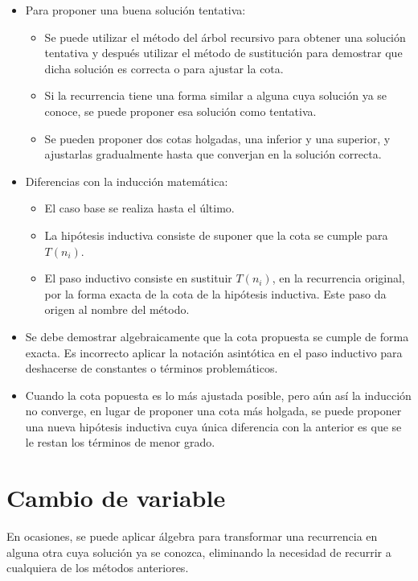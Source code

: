 \begin{itemize}
    \item Para proponer una buena solución tentativa:
    \begin{itemize}
        \item Se puede utilizar el método del árbol recursivo para obtener una solución
        tentativa y después utilizar el método de sustitución para demostrar
        que dicha solución es correcta o para ajustar la cota.
        \item Si la recurrencia tiene una forma similar a alguna cuya solución ya
        se conoce, se puede proponer esa solución como tentativa.
        \item Se pueden proponer dos cotas holgadas, una inferior y una superior,
        y ajustarlas gradualmente hasta que converjan en la solución correcta. 
    \end{itemize}
    \item Diferencias con la inducción matemática:
    \begin{itemize}
        \item El caso base se realiza hasta el último.
        \item La hipótesis inductiva consiste de suponer que la cota se cumple para
        $T(n_{i})$.
        \item El paso inductivo consiste en sustituir $T(n_{i})$, en la recurrencia
        original, por la forma exacta de la cota de la hipótesis inductiva.
        Este paso da origen al nombre del método.
    \end{itemize}
    \item Se debe demostrar algebraicamente que la cota propuesta se cumple
    de forma exacta. Es incorrecto aplicar la notación asintótica en el
    paso inductivo para deshacerse de constantes o términos problemáticos.
    \item Cuando la cota popuesta es lo más ajustada posible, pero aún así la
    inducción no converge, en lugar de proponer una cota más holgada,
    se puede proponer una nueva hipótesis inductiva cuya única diferencia
    con la anterior es que se le restan los términos de menor grado.
\end{itemize}

\section{Cambio de variable}

En ocasiones, se puede aplicar álgebra para transformar una recurrencia
en alguna otra cuya solución ya se conozca, eliminando
la necesidad de recurrir a cualquiera de los métodos anteriores.

